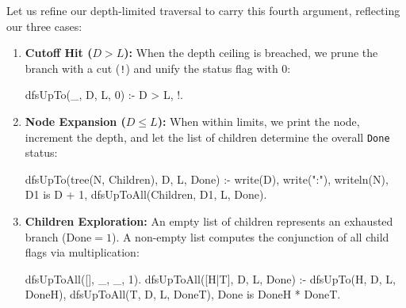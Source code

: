Let us refine our depth-limited traversal to carry this fourth argument, reflecting our three cases:

\begin{enumerate}
    \item \textbf{Cutoff Hit ($D > L$):} When the depth ceiling is breached, we prune the branch with a cut (\texttt{!}) and unify the status flag with $0$:
\begin{codeblock}
dfsUpTo(_, D, L, 0) :-
    D > L,
    !.
\end{codeblock}

    \item \textbf{Node Expansion ($D \le L$):} When within limits, we print the node, increment the depth, and let the list of children determine the overall \texttt{Done} status:
\begin{codeblock}
dfsUpTo(tree(N, Children), D, L, Done) :-
    write(D), write(":"), writeln(N),
    D1 is D + 1,
    dfsUpToAll(Children, D1, L, Done).
\end{codeblock}

    \item \textbf{Children Exploration:} An empty list of children represents an exhausted branch ($\text{Done} = 1$). A non-empty list computes the conjunction of all child flags via multiplication:
\begin{codeblock}
dfsUpToAll([], _, _, 1).
dfsUpToAll([H|T], D, L, Done) :-
    dfsUpTo(H, D, L, DoneH),
    dfsUpToAll(T, D, L, DoneT),
    Done is DoneH * DoneT.
\end{codeblock}
\end{enumerate}



